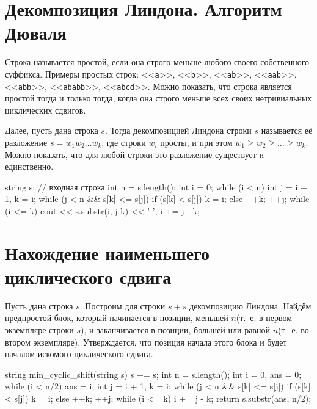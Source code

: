 \documentclass[12pt, titlepage]{article}
\renewcommand{\tt}[1]{\texttt{\small #1}}
\begin{document}
\section{Декомпозиция Линдона. Алгоритм Дюваля}

Строка называется простой, если она строго меньше любого своего собственного суффикса. Примеры простых строк: <<\tt{a}>>, <<\tt{b}>>, <<\tt{ab}>>, <<\tt{aab}>>, <<\tt{abb}>>, <<\tt{ababb}>>, <<\tt{abcd}>>. Можно показать, что строка является простой тогда и только тогда, когда она строго меньше всех своих нетривиальных циклических сдвигов.

Далее, пусть дана строка $s$. Тогда декомпозицией Линдона строки $s$ называется её разложение $s=w_1w_2\ldots w_k$, где строки $w_i$ просты, и при этом $w_1 \ge w_2 \ge \ldots \ge w_k$. Можно показать, что для любой строки  это разложение существует и единственно.

\begin{cppcode}
string s; // входная строка
int n = s.length();
int i = 0;
while (i < n) {
    int j = i + 1, k = i;
    while (j < n && s[k] <= s[j]) {
        if (s[k] < s[j])
            k = i;
        else
            ++k;
        ++j;
    }
    while (i <= k) {
        cout << s.substr(i, j-k) << ' ';
        i += j - k;
    }
}
\end{cppcode}


\section{Нахождение наименьшего циклического сдвига}

Пусть дана строка $s$. Построим для строки $s+s$ декомпозицию Линдона. Найдём предпростой блок, который начинается в позиции, меньшей $n$(т.~е. в первом экземпляре строки $s$), и заканчивается в позиции, большей или равной $n$(т.~е. во втором экземпляре). Утверждается, что позиция начала этого блока и будет началом искомого циклического сдвига.

\begin{cppcode}
string min_cyclic_shift(string s) {
    s += s;
    int n = s.length();
    int i = 0, ans = 0;
    while (i < n/2) {
        ans = i;
        int j = i + 1, k = i;
        while (j < n && s[k] <= s[j]) {
            if (s[k] < s[j])
                k = i;
            else
                ++k;
            ++j;
        }
        while (i <= k) i += j - k;
    }
    return s.substr(ans, n/2);
}
\end{cppcode}
\end{document}
